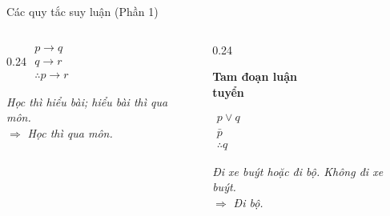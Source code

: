 \documentclass[aspectratio=169, 11pt]{beamer}
\begin{document}
\begin{frame}{Các quy tắc suy luận (Phần 1)}
\begin{columns}[t, onlytextwidth]
\begin{column}{0.24\textwidth}
    $\begin{array}{l}
      p \rightarrow q \\
      q \rightarrow r \\
      \hline
      \therefore p \rightarrow r
    \end{array}$\par
    \vspace{0.3cm}
    \footnotesize\textit{Học thì hiểu bài; hiểu bài thì qua môn.}\\
    $\Rightarrow$ \textit{Học thì qua môn.}
  \end{column}
  \begin{column}{0.24\textwidth}
    \centering
    \parbox[t][0.85cm][t]{\linewidth}{\centering\color{uitblue}\textbf{Tam đoạn luận\\ tuyển}}\par
    \vspace{0.15cm}
    $\begin{array}{l}
      p \lor q \\
      \bar{p} \\
      \hline
      \therefore q
    \end{array}$\par
    \vspace{0.3cm}
    \footnotesize\textit{Đi xe buýt hoặc đi bộ. Không đi xe buýt.}\\
    $\Rightarrow$ \textit{Đi bộ.}
  \end{column}
\end{columns}
\end{frame}
\end{document}
